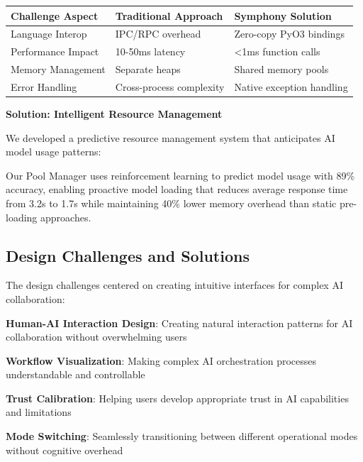 \begin{center}
\begin{tabular}{@{}lll@{}}
\toprule
\textbf{Challenge Aspect} & \textbf{Traditional Approach} & \textbf{Symphony Solution} \\
\midrule
Language Interop & IPC/RPC overhead & Zero-copy PyO3 bindings \\
Performance Impact & 10-50ms latency & <1ms function calls \\
Memory Management & Separate heaps & Shared memory pools \\
Error Handling & Cross-process complexity & Native exception handling \\
\bottomrule
\end{tabular}
\end{center}

\textbf{Solution: Intelligent Resource Management}

We developed a predictive resource management system that anticipates AI model usage patterns:

\begin{infobox}[title=Resource Management Innovation]
Our Pool Manager uses reinforcement learning to predict model usage with 89\% accuracy, enabling proactive model loading that reduces average response time from 3.2s to 1.7s while maintaining 40\% lower memory overhead than static pre-loading approaches.
\end{infobox}

\subsection*{Design Challenges and Solutions}

The design challenges centered on creating intuitive interfaces for complex AI collaboration:

\begin{expandedlist}
    \item \textbf{Human-AI Interaction Design}: Creating natural interaction patterns for AI collaboration without overwhelming users
    \item \textbf{Workflow Visualization}: Making complex AI orchestration processes understandable and controllable
    \item \textbf{Trust Calibration}: Helping users develop appropriate trust in AI capabilities and limitations
    \item \textbf{Mode Switching}: Seamlessly transitioning between different operational modes without cognitive overhead
\end{expandedlist}

